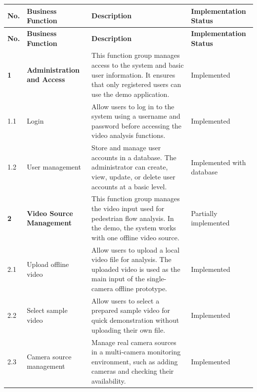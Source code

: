 \documentclass[12pt,a4paper]{report}
\renewcommand{\arraystretch}{1.25}
\begin{document}
\begin{small}
\setlength{\tabcolsep}{4pt}
\renewcommand{\arraystretch}{1.25}

\begin{longtable}{|>{\centering\arraybackslash}p{1.2cm}|
                  >{\raggedright\arraybackslash}p{4.0cm}|
                  >{\raggedright\arraybackslash}p{6.0cm}|
                  >{\raggedright\arraybackslash}p{3.0cm}|}
\hline
\rowcolor{HeaderBlue}
\textbf{No.} & \textbf{Business Function} & \textbf{Description} & \textbf{Implementation Status} \\
\hline
\endfirsthead

\hline
\rowcolor{HeaderBlue}
\textbf{No.} & \textbf{Business Function} & \textbf{Description} & \textbf{Implementation Status} \\
\hline
\endhead

\textbf{1} & 
\textbf{Administration and Access} & 
This function group manages access to the system and basic user information. It ensures that only registered users can use the demo application. & 
Implemented \\
\hline

1.1 & 
Login & 
Allow users to log in to the system using a username and password before accessing the video analysis functions. & 
Implemented \\
\hline

1.2 & 
User management & 
Store and manage user accounts in a database. The administrator can create, view, update, or delete user accounts at a basic level. & 
Implemented with database \\
\hline

\textbf{2} & 
\textbf{Video Source Management} & 
This function group manages the video input used for pedestrian flow analysis. In the demo, the system works with one offline video source. & 
Partially implemented \\
\hline

2.1 & 
Upload offline video & 
Allow users to upload a local video file for analysis. The uploaded video is used as the main input of the single-camera offline prototype. & 
Implemented \\
\hline

2.2 & 
Select sample video & 
Allow users to select a prepared sample video for quick demonstration without uploading their own file. & 
Implemented \\
\hline

2.3 & 
Camera source management & 
Manage real camera sources in a multi-camera monitoring environment, such as adding cameras and checking their availability. & 
Implemented \\
\hline


\end{longtable}
\end{small}
\end{document}
